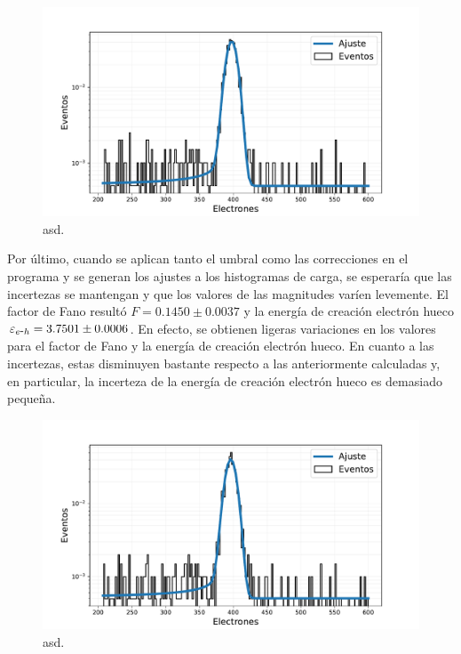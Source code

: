 \begin{figure}[H]
    \centering
        \includegraphics[scale=0.5]{Figs/HistFit_100c_EPIX15_OHDU1_SinCorr.pdf}
    \caption{\footnotesize{asd.}}
    \label{fig:OHDU1_EPIX15}
\end{figure}
Por último, cuando se aplican tanto el umbral como las correcciones en el programa y se generan los ajustes a los histogramas de carga, se esperaría que las incertezas se mantengan y que los valores de las magnitudes varíen levemente. El factor de Fano resultó $F = 0.1450 \pm 0.0037$ y la energía de creación electrón hueco $\varepsilon_{e\mbox{-}h} = 3.7501 \pm 0.0006$. En efecto, se obtienen ligeras variaciones en los valores para el factor de Fano y la energía de creación electrón hueco. En cuanto a las incertezas, estas disminuyen bastante respecto a las anteriormente calculadas y, en particular, la incerteza de la energía de creación electrón hueco es demasiado pequeña.
\begin{figure}[H]
    \centering
        \includegraphics[scale=0.5]{Figs/HistFit_100c_EPIX15_OHDU1_Corr.pdf}
    \caption{\footnotesize{asd.}}
    \label{fig:OHDU1_EPIX15_corregido}
\end{figure}
